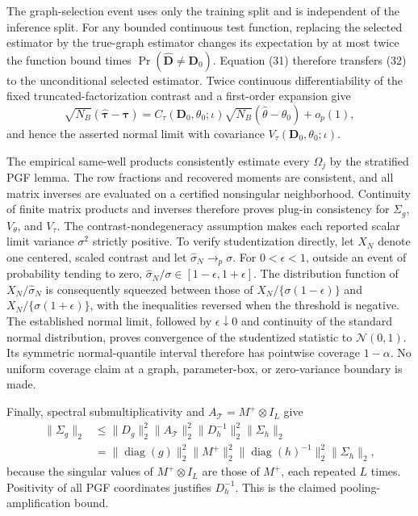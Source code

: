 The graph-selection event uses only the training split and is independent of the inference split.  For any bounded continuous test function, replacing the selected estimator by the true-graph estimator changes its expectation by at most twice the function bound times \(\Pr(\widehat{\boldsymbol D}\ne\boldsymbol D_0)\).  Equation (31) therefore transfers (32) to the unconditional selected estimator.  Twice continuous differentiability of the fixed truncated-factorization contrast and a first-order expansion give
\[
 \sqrt{N_B}(\widehat{\boldsymbol\tau}-\boldsymbol\tau)
 =C_\tau(\boldsymbol D_0,\theta_0;\iota)
 \sqrt{N_B}(\widehat\theta-\theta_0)+o_p(1),
\]
and hence the asserted normal limit with covariance
\(V_\tau(\boldsymbol D_0,\theta_0;\iota)\).

The empirical same-well products consistently estimate every \(\Omega_j\) by the stratified PGF lemma.  The row fractions and recovered moments are consistent, and all matrix inverses are evaluated on a certified nonsingular neighborhood.  Continuity of finite matrix products and inverses therefore proves plug-in consistency for \(\Sigma_g\), \(V_\theta\), and \(V_\tau\).  The contrast-nondegeneracy assumption makes each reported scalar limit variance \(\sigma^2\) strictly positive.  To verify studentization directly, let \(X_N\) denote one centered, scaled contrast and let \(\widehat\sigma_N\to_p\sigma\).  For \(0<\epsilon<1\), outside an event of probability tending to zero, \(\widehat\sigma_N/\sigma\in[1-\epsilon,1+\epsilon]\).  The distribution function of \(X_N/\widehat\sigma_N\) is consequently squeezed between those of \(X_N/\{\sigma(1-\epsilon)\}\) and \(X_N/\{\sigma(1+\epsilon)\}\), with the inequalities reversed when the threshold is negative.  The established normal limit, followed by \(\epsilon\downarrow0\) and continuity of the standard normal distribution, proves convergence of the studentized statistic to \(\mathcal N(0,1)\).  Its symmetric normal-quantile interval therefore has pointwise coverage \(1-\alpha\).  No uniform coverage claim at a graph, parameter-box, or zero-variance boundary is made.

Finally, spectral submultiplicativity and \(A_{\mathcal T}=M^+\otimes I_L\) give
\[
\begin{aligned}
 \|\Sigma_g\|_2
 &\leq\|D_g\|_2^2\|A_{\mathcal T}\|_2^2
 \|D_h^{-1}\|_2^2\|\Sigma_h\|_2\\
 &=\|\operatorname{diag}(g)\|_2^2\|M^+\|_2^2
 \|\operatorname{diag}(h)^{-1}\|_2^2\|\Sigma_h\|_2,
\end{aligned}
\]
because the singular values of \(M^+\otimes I_L\) are those of \(M^+\), each repeated \(L\) times.  Positivity of all PGF coordinates justifies \(D_h^{-1}\).  This is the claimed pooling-amplification bound.

